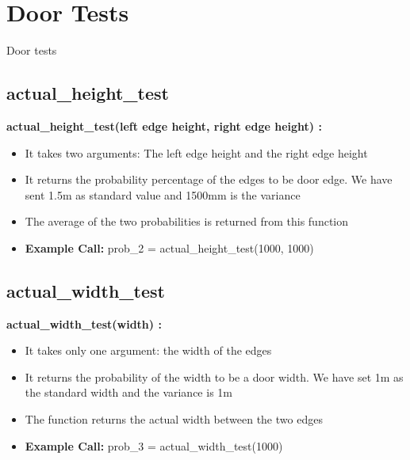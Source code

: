 \documentclass[10pt, a4paper]{beamer}
\begin{document}
\section{Door Tests}
\begin{frame}[allowframebreaks]{Door tests}
  \subsection{actual\_height\_test}
    \textbf{actual\_height\_test(left edge height, right edge height) : }
      \begin{itemize}
	\item It takes two arguments: The left edge height and the right edge height
	\item It returns the probability percentage of the edges to be door edge. We have sent 1.5m as standard value and 1500mm is the variance
	\item The average of the two probabilities is returned from this function
	\item \textbf{Example Call:} prob\_2 = actual\_height\_test(1000, 1000)
      \end{itemize}
\framebreak
  \subsection{actual\_width\_test}
    \textbf{actual\_width\_test(width) : }
      \begin{itemize}
       \item It takes only one argument: the width of the edges
       \item It returns the probability of the width to be a door width. We have set 1m as the standard width and the variance is 1m
       \item The function returns the actual width between the two edges
       \item \textbf{Example Call:} prob\_3 = actual\_width\_test(1000)
      \end{itemize}
\framebreak

\end{frame}
\end{document}

